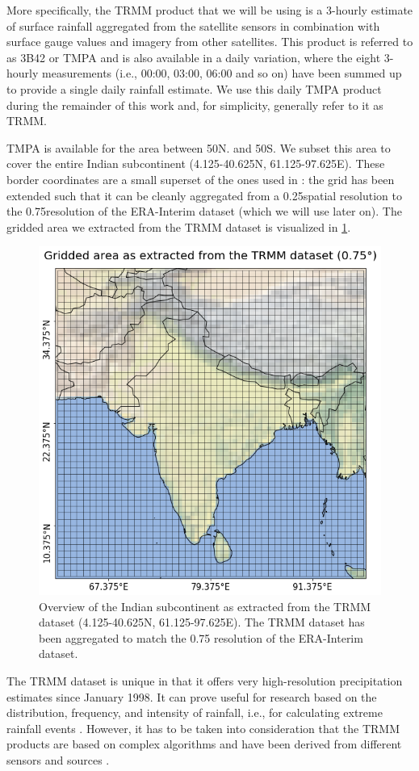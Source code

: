 More specifically, the TRMM product that we will be using is a 3-hourly estimate of surface rainfall aggregated from the satellite sensors in combination with surface gauge values and imagery from other satellites. This product is referred to as 3B42 or TMPA and is also available in a daily variation, where the eight 3-hourly measurements (i.e., 00:00, 03:00, 06:00 and so on) have been summed up to provide a single daily rainfall estimate. We use this daily TMPA product during the remainder of this work and, for simplicity, generally refer to it as TRMM.

TMPA is available for the area between 50\degree N. and 50\degree S. We subset this area to cover the entire Indian subcontinent (4.125-40.625\degree N, 61.125-97.625\degree E). These border coordinates are a small superset of the ones used in \citep{Stolbova.2015}: the grid has been extended such that it can be cleanly aggregated from a 0.25\degree spatial resolution to the 0.75\degree resolution of the ERA-Interim dataset (which we will use later on). The gridded area we extracted from the TRMM dataset is visualized in \cref{fig:trmm_grid}.

\begin{figure}[h]
  \centering
  \includegraphics[width=0.5\linewidth]{./99_appendix/img/area_overview_grid}
  \caption{Overview of the Indian subcontinent as extracted from the TRMM dataset (4.125-40.625\degree N, 61.125-97.625\degree E). The TRMM dataset has been aggregated to match the {0.75\degree} resolution of the ERA-Interim dataset.}
  \label{fig:trmm_grid}
\end{figure}

The TRMM dataset is unique in that it offers very high-resolution precipitation estimates since January 1998. It can prove useful for research based on the distribution, frequency, and intensity of rainfall, i.e., for calculating extreme rainfall events \citep{Stolbova.2015}. However, it has to be taken into consideration that the TRMM products are based on complex algorithms and have been derived from different sensors and sources \citep{Huffman.2017b}.

